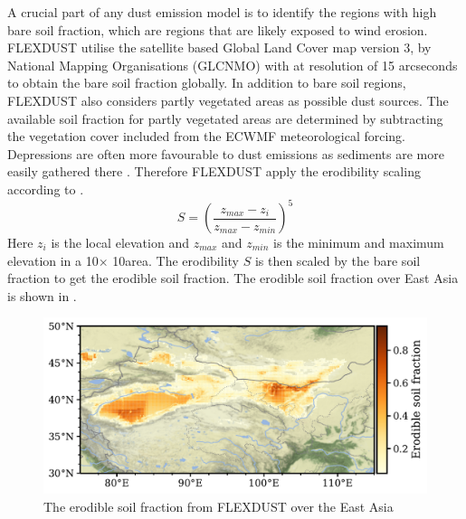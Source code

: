 A crucial part of any dust emission model is to identify the regions with high bare soil 
fraction, which are regions that are likely exposed to wind erosion. FLEXDUST utilise the satellite 
based Global Land Cover map version 3, by National Mapping Organisations (GLCNMO) with at 
resolution of 15 arcseconds \parencite{shirahata2017production} to obtain the bare soil fraction globally.
In addition to bare soil regions, FLEXDUST also considers partly vegetated areas as possible
dust sources. The available soil fraction for partly vegetated areas are determined by
subtracting the vegetation cover included from the ECWMF meteorological forcing.
Depressions are often more favourable to dust emissions as sediments are more easily gathered there \parencite{zender2003mineral}. Therefore FLEXDUST apply the erodibility scaling 
 according to \textcite{dust_dist_Ginoux2001}. 
\begin{equation}\label{eq_ero_soil_frac}
    S = \left(\frac{z_{max} - z_i}{z_{max} - z_{min}}\right)^5 
\end{equation}    
Here $z_i$ is the local elevation and $z_{max}$ and $z_{min}$ is the minimum and
maximum elevation in a 10\degree $\times$ 10\degree area.  The erodibility $S$ is
then scaled by the bare soil fraction to get the erodible soil fraction. The erodible soil fraction over East Asia is shown in . 
\begin{figure}[hptb]
    \centering
    \includegraphics[width=\textwidth]{../figs/erodible_soil_fraction.pdf}
    \caption{The erodible soil fraction from FLEXDUST over the East Asia}
    \label{fig:erodible_soil_fraction_EA}
\end{figure}

